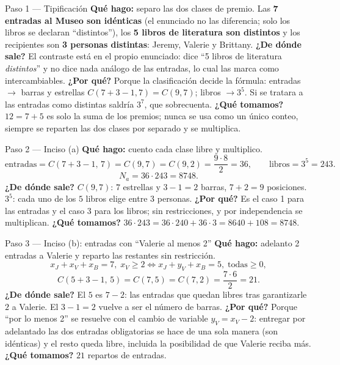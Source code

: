 \documentclass[11pt]{article}
\begin{document}
\begin{paso}{Paso 1 --- Tipificación}
\textbf{Qué hago:} separo las dos clases de premio.
Las \textbf{7 entradas al Museo son idénticas} (el enunciado no las diferencia; solo los libros se declaran ``distintos''), los \textbf{5 libros de literatura son distintos} y los recipientes son \textbf{3 personas distintas}: Jeremy, Valerie y Brittany.
\textbf{¿De dónde sale?} El contraste está en el propio enunciado: dice ``5 libros de literatura \emph{distintos}'' y no dice nada análogo de las entradas, lo cual las marca como intercambiables.
\textbf{¿Por qué?} Porque la clasificación decide la fórmula: entradas $\to$ barras y estrellas $C(7+3-1,7)=C(9,7)$; libros $\to 3^5$. Si se tratara a las entradas como distintas saldría $3^7$, que sobrecuenta.
\textbf{¿Qué tomamos?} $12=7+5$ es solo la suma de los premios; nunca se usa como un único conteo, siempre se reparten las dos clases por separado y se multiplica.
\end{paso}

\begin{paso}{Paso 2 --- Inciso (a)}
\textbf{Qué hago:} cuento cada clase libre y multiplico.
\[
\text{entradas}=C(7+3-1,\,7)=C(9,7)=C(9,2)=\frac{9\cdot 8}{2}=36,\qquad \text{libros}=3^5=243 .
\]
\[
N_a=36\cdot 243=8748 .
\]
\textbf{¿De dónde sale?} $C(9,7)$: $7$ estrellas y $3-1=2$ barras, $7+2=9$ posiciones. $3^5$: cada uno de los $5$ libros elige entre $3$ personas.
\textbf{¿Por qué?} Es el caso 1 para las entradas y el caso 3 para los libros; sin restricciones, y por independencia se multiplican.
\textbf{¿Qué tomamos?} $36\cdot 243=36\cdot 240+36\cdot3=8640+108=8748$.
\end{paso}

\begin{paso}{Paso 3 --- Inciso (b): entradas con ``Valerie al menos 2''}
\textbf{Qué hago:} adelanto 2 entradas a Valerie y reparto las restantes sin restricción.
\[
x_J+x_V+x_B=7,\;x_V\ge2 \iff x_J+y_V+x_B=5,\;\text{todas}\ge0,
\]
\[
C(5+3-1,\,5)=C(7,5)=C(7,2)=\frac{7\cdot 6}{2}=21 .
\]
\textbf{¿De dónde sale?} El $5$ es $7-2$: las entradas que quedan libres tras garantizarle $2$ a Valerie. El $3-1=2$ vuelve a ser el número de barras.
\textbf{¿Por qué?} Porque ``por lo menos 2'' se resuelve con el cambio de variable $y_V=x_V-2$: entregar por adelantado las dos entradas obligatorias se hace de una sola manera (son idénticas) y el resto queda libre, incluida la posibilidad de que Valerie reciba más.
\textbf{¿Qué tomamos?} $21$ repartos de entradas.
\end{paso}
\end{document}
